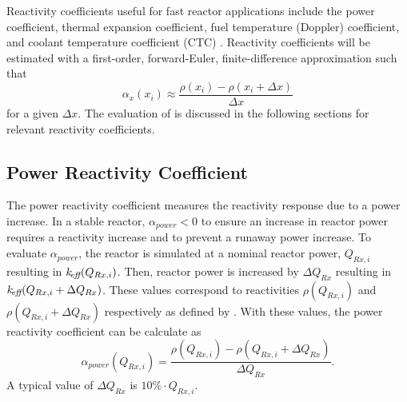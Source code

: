   Reactivity coefficients useful for fast reactor applications include the power 
  coefficient, thermal expansion coefficient, fuel temperature (Doppler)
  coefficient, and coolant temperature coefficient (CTC) \cite{textbookknief}.
  Reactivity coefficients will be estimated with a first-order, forward-Euler,
  finite-difference approximation such that
  \begin{equation}
    \label{eq:reactivity_coefficient_finite_difference}
    \alpha_x(x_i) \approx \frac{\rho(x_i) - \rho(x_i + \Delta x)}{\Delta x}
  \end{equation}
  for a given $\Delta x$. The evaluation of
   is discussed in the
  following sections for relevant reactivity coefficients.

  \subsection{Power Reactivity Coefficient}
  \label{sec:power_reactivity_coefficient}
    The power reactivity coefficient measures the reactivity response due to a 
    power increase. In a stable reactor, $\alpha_{power} < 0$ to ensure an 
    increase in reactor power requires a reactivity increase and to prevent a 
    runaway power increase. To evaluate $\alpha_{power}$, the reactor is
    simulated at a nominal reactor power, $Q_{Rx,i}$ resulting in
    $k_{\!\mbox{\scriptsize \em eff}}(Q_{Rx,i})$. Then, reactor power is increased by $\Delta Q_{Rx}$
    resulting in $k_{\!\mbox{\scriptsize \em eff}}(Q_{Rx,i} + \Delta Q_{Rx})$. These \keff values 
    correspond to reactivities $\rho(Q_{Rx,i})$ and 
    ${\rho(Q_{Rx,i} + \Delta Q_{Rx})}$ respectively as defined by 
    . With these values, the power reactivity coefficient 
    can be calculate as
    \begin{equation}
      \label{eq:power_reactivity_coefficient}
      \alpha_{power}(Q_{Rx,i}) = \frac{\rho(Q_{Rx,i}) - \rho(Q_{Rx,i} + 
        \Delta Q_{Rx})} {\Delta Q_{Rx}}.
    \end{equation}
    A typical value of $\Delta Q_{Rx}$ is $10\% \cdot Q_{Rx,i}$.

